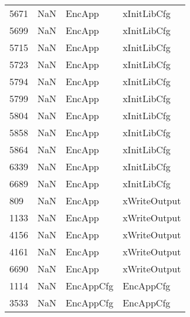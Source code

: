 \begin{tabular}{llll}
5671 &                   NaN &                     EncApp &                               xInitLibCfg \\
5699 &                   NaN &                     EncApp &                               xInitLibCfg \\
5715 &                   NaN &                     EncApp &                               xInitLibCfg \\
5723 &                   NaN &                     EncApp &                               xInitLibCfg \\
5794 &                   NaN &                     EncApp &                               xInitLibCfg \\
5799 &                   NaN &                     EncApp &                               xInitLibCfg \\
5804 &                   NaN &                     EncApp &                               xInitLibCfg \\
5858 &                   NaN &                     EncApp &                               xInitLibCfg \\
5864 &                   NaN &                     EncApp &                               xInitLibCfg \\
6339 &                   NaN &                     EncApp &                               xInitLibCfg \\
6689 &                   NaN &                     EncApp &                               xInitLibCfg \\
809  &                   NaN &                     EncApp &                              xWriteOutput \\
1133 &                   NaN &                     EncApp &                              xWriteOutput \\
4156 &                   NaN &                     EncApp &                              xWriteOutput \\
4161 &                   NaN &                     EncApp &                              xWriteOutput \\
6690 &                   NaN &                     EncApp &                              xWriteOutput \\
1114 &                   NaN &                  EncAppCfg &                                 EncAppCfg \\
3533 &                   NaN &                  EncAppCfg &                                 EncAppCfg \\

\end{tabular}
